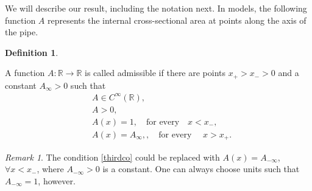 \documentclass[10pt,a4paper]{article}
\theoremstyle{plain}
\theoremstyle{definition}
\newtheorem{definition}[theorem]{Definition}
\theoremstyle{remark}
\newtheorem{remark}[theorem]{Remark}
\numberwithin{equation}{section}
\newcommand{\R}{\mathbb{R}}
\begin{document}
\medskip We will describe our result, including the notation next. In models, the {following} function $A$ represents the internal cross-sectional area at points along the axis of the pipe.
\begin{definition}\label{def:admissible}

A function $A : \R \to \R$  is called admissible if there are  points $x_+> x_- > 0$ and a constant $A_\infty >0$ such that 
\begin{align}
&A \in C^\infty(\R), \\
& A > 0, \\
& A (x) = 1 , \quad \text{for every} \quad x < x_- , \label{thirdco} \\
&A (x) = A_\infty, , \quad \text{for every } \quad x > x_+. 
\end{align}
\end{definition}  
\begin{remark}
The 
condition \eqref{thirdco} could be replaced with $A (x) = A_{-\infty}$, $\forall  x < x_-$, where $A_{-\infty} >0 $ is a constant. One can always choose units such that $ A_{-\infty} = 1$, however. 
\end{remark}
\end{document}
